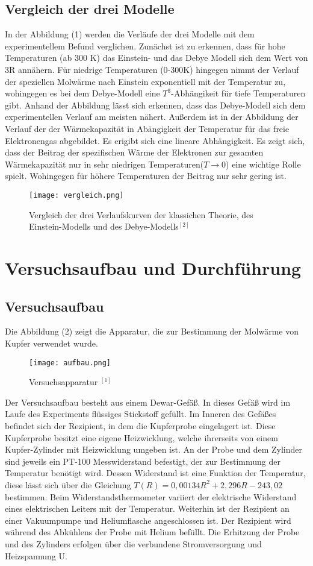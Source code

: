 \documentclass{article}
\begin{document}
\subsection{Vergleich der drei Modelle}
In der Abbildung (1) werden die Verläufe der drei Modelle mit dem experimentellem Befund verglichen. Zunächst ist zu erkennen, dass für hohe Temperaturen (ab 300 K) das Einstein- und das Debye Modell sich dem Wert von 3R annähern. Für niedrige Temperaturen (0-300K) hingegen nimmt der Verlauf der speziellen Molwärme nach Einstein exponentiell mit der Temperatur zu, wohingegen es bei dem Debye-Modell eine $T^3$-Abhängikeit für tiefe Temperaturen gibt. Anhand der Abbildung lässt sich erkennen, dass das Debye-Modell sich dem experimentellen Verlauf am meisten nähert. Außerdem ist in der Abbildung der Verlauf der der Wärmekapazität in Abängigkeit der Temperatur für das freie Elektronengas abgebildet. Es erigibt sich eine lineare Abhängigkeit. Es zeigt sich, dass der Beitrag der spezifischen Wärme der Elektronen zur gesamten Wärmekapazität nur in sehr niedrigen Temperaturen($T\rightarrow 0$) eine wichtige Rolle spielt. Wohingegen für höhere Temperaturen der Beitrag nur sehr gering ist. 
\begin{figure}[H]
	\centering
	\texttt{[image: vergleich.png]}
	\caption{  Vergleich der drei Verlaufskurven der klassichen Theorie, des Einstein-Modells und des Debye-Modells$^{[2]}$}   
	\label{fig: abb. 1}
\end{figure} 
\section{Versuchsaufbau und Durchführung}
\subsection{Versuchsaufbau}
Die Abbildung (2) zeigt die Apparatur, die zur Bestimmung der Molwärme von Kupfer verwendet wurde. 
\begin{figure}[H]
	\centering
	\texttt{[image: aufbau.png]}
	\caption{ Versuchsapparatur $^{[1]}$}   
	\label{fig: abb. 1}
\end{figure}
Der Versuchsaufbau besteht aus einem Dewar-Gefäß. In dieses Gefäß wird im Laufe des Experiments flüssiges Stickstoff gefüllt. Im Inneren des Gefäßes befindet sich der Rezipient, in dem die Kupferprobe eingelagert ist. Diese Kupferprobe besitzt eine eigene Heizwicklung, welche ihrerseits von einem Kupfer-Zylinder mit Heizwicklung umgeben ist. An der Probe und dem Zylinder sind jeweils ein PT-100 Messwiderstand befestigt, der zur Bestimmung der Temperatur benötigt wird. Dessen Widerstand ist eine Funktion der Temperatur, diese lässt sich über die Gleichung $T(R)=0,00134R^2+2,296R-243,02$ bestimmen. Beim Widerstandsthermometer variiert der elektrische Widerstand eines elektrischen Leiters mit der Temperatur. Weiterhin ist der Rezipient an einer Vakuumpumpe und Heliumflasche angeschlossen ist. Der Rezipient wird während des Abkühlens der Probe mit Helium befüllt. Die Erhitzung der Probe und des Zylinders erfolgen über die verbundene Stromversorgung und Heizspannung U. 
\end{document}
